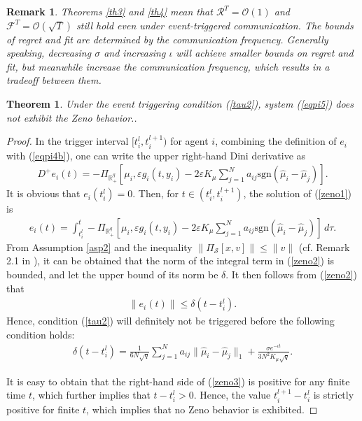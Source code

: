 \documentclass[letterpaper, 10 pt, conference]{ieeeconf}  %
\newtheorem{theorem}{ {Theorem}}
\newtheorem{remark}{ {Remark}}
\newcommand{\sign}[1]{\mathrm{sgn}(#1)}
\begin{document}
\begin{remark}\label{remark3}
	Theorems \ref{th3} and \ref{th4} mean that $\mathcal{R}^T=\mathcal{O}(1)$ and $\mathcal{F}^T = \mathcal{O}(\sqrt{T})$ still hold even under event-triggered communication. The bounds of regret and fit are determined by the communication frequency. Generally speaking, decreasing $\sigma$ and increasing $\iota$ will achieve smaller bounds on regret and fit, but meanwhile increase the communication frequency, which results in a tradeoff between them.	
\end{remark}

\begin{theorem}\label{th5}
	Under the event triggering condition (\ref{tau2}), system (\ref{eqpi5}) does not exhibit the Zeno behavior.. 
\end{theorem}
\begin{proof}
	In the trigger interval $[t_i^l,t_i^{l+1})$ for agent $i$, combining the definition of $e_i$ with (\ref{eqpi4b}), one can write the upper right-hand Dini derivative as
	\begin{align}
		D^+ e_i(t){=} - \!\Pi_{\mathbb{R}_+^q}[\mu_i, \varepsilon g_i(t,y_i) {-}2\varepsilon K_\mu \sum_{j=1}^N a_{ij}\sign{\hat\mu_i{-}\hat\mu_j}].\label{zeno1}
	\end{align}
	It is obvious that $e_i(t_i^l)=0$. Then, for $t\in (t_i^l,t_i^{l+1})$, the solution of (\ref{zeno1}) is
	\begin{align}
		e_i(t){=} \!\int_{t_i^l}^{t} \!- \!\Pi_{\mathbb{R}_+^q}[\mu_i, \varepsilon g_i(t,y_i) {-}2\varepsilon K_\mu \sum_{j=1}^N a_{ij}\sign{\hat\mu_i{-}\hat\mu_j}] \,d\tau. \label{zeno2}
	\end{align}
	From Assumption \ref{asp2} and the inequality $\|\Pi_{\mathcal{S}}[x,v]\|\le\|v\|$ (cf. Remark 2.1 in \cite{zhang1995}), it can be obtained that the norm of the integral term in (\ref{zeno2}) is bounded, and let the upper bound of its norm be $\delta$.  It then follows from (\ref{zeno2}) that
	\begin{align}
		\|e_i(t)\| \le \delta(t-t_i^l).
	\end{align} 
	Hence, condition (\ref{tau2}) will definitely not be triggered before the following  condition holds:
	\begin{align}
		\delta(t-t_i^l)=\frac{1}{6N\sqrt{q}}\sum_{j=1}^N a_{ij} \|\hat\mu_i-\hat\mu_j\|_1 {+} \frac{\sigma e^{-\iota t}}{3N^2K_\mu\sqrt{q}} .\label{zeno3}
	\end{align}
	
	It is easy to obtain that the right-hand side of (\ref{zeno3}) is positive for any finite time $t$,  which further implies that $t-t_i^l>0$. Hence, the value $t_i^{l+1}-t_i^l$ is strictly positive for finite $t$,
	which implies that no Zeno behavior is exhibited.
\end{proof}
\end{document}
